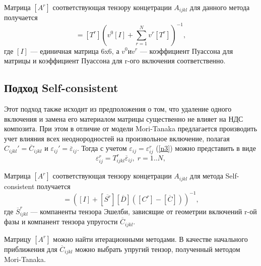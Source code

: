 \documentclass[12pt, a4paper]{article}
\begin{document}
Матрица $[A^r]$ соответствующая тензору концетрации $A_{ijkl}$ для данного метода получается
\begin{equation}
	[A^r]=[T^r](v^0[I]+\sum_{r=1}^{N}v^r[T^r])^{-1},
	\label{n6}
\end{equation}
где $[I]$ --- единичная матрица 6x6, а $v^0 и v^r$ --- коэффициент Пуассона для матрицы и коэффициент Пуассона для r-ого включения соответственно.
\newpage
\subsection{Подход Self-consistent}
Этот подход также исходит из предположения о том, что удаление одного включения и замена его материалом матрицы существенно не влияет на НДС композита. При этом в отличие от модели Mori-Tanaka предлагается производить учет влияния всех неоднородностей на произвольное включение, полагая $C_{ijkl}'=\overline{C}_{ijkl}$  и $\varepsilon_{ij}'=\overline{\varepsilon}_{ij}$. Тогда с учетом $\varepsilon_{ij}=\varepsilon_{ij}^r$ (\ref{n3}) можно представить в виде
\begin{equation}
	\varepsilon_{ij}^r=T_{ijkl}^r \overline{\varepsilon}_{ij}, \; r=1..N,
	\label{n7}
\end{equation}

Матрица $[A^r]$ соответствующая тензору концетрации $A_{ijkl}$ для метода Self-consistent получается
\begin{equation}
	[A^r]=([I]+[ \overline{S^r} ][\overline{D}]([C^r]-[\overline{C}]))^{-1},
	\label{n6}
\end{equation}
где $\overline{S}_{ijkl}^r$ --- компаненты тензора Эшелби, зависящие от геометрии включений r-ой фазы и компанент тензора упругости $\overline{C}_{ijkl}$.
 
 Матрицу $[A^r]$ можно найти итерационными методами. В качестве начального приближения для $\overline{C}_{ijkl}$ можно выбрать упругий тензор, полученный методом Mori-Tanaka.
 

\newpage
\end{document}
